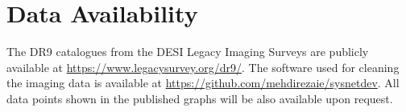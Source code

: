 \section*{Data Availability}
\label{sec:dataavail}
The DR9 catalogues from the DESI Legacy Imaging Surveys are publicly available at \href{https://www.legacysurvey.org/dr9/}{https://www.legacysurvey.org/dr9/}. The software used for cleaning the imaging data is available at \href{https://github.com/mehdirezaie/sysnetdev}{https://github.com/mehdirezaie/sysnetdev}. All data points shown in the published graphs will be also available upon request.